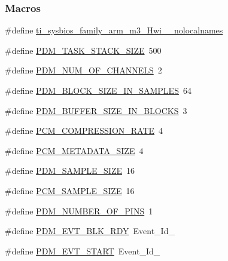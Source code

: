 \subsubsection*{Macros}
\begin{DoxyCompactItemize}
\item 
\#define \hyperlink{_p_d_m_c_c26_x_x_8h_aaa17ecf48f5762e2e1bdb0bab8aacf0c}{ti\+\_\+sysbios\+\_\+family\+\_\+arm\+\_\+m3\+\_\+\+Hwi\+\_\+\+\_\+nolocalnames}
\item 
\#define \hyperlink{_p_d_m_c_c26_x_x_8h_adc205204f69ea867c95b30efe1530746}{P\+D\+M\+\_\+\+T\+A\+S\+K\+\_\+\+S\+T\+A\+C\+K\+\_\+\+S\+I\+Z\+E}~500
\item 
\#define \hyperlink{_p_d_m_c_c26_x_x_8h_ab3e267d8e69eec7a1cc819e11ed3652b}{P\+D\+M\+\_\+\+N\+U\+M\+\_\+\+O\+F\+\_\+\+C\+H\+A\+N\+N\+E\+L\+S}~2
\item 
\#define \hyperlink{_p_d_m_c_c26_x_x_8h_aaf34b322942f71e96c00eaaf13e81612}{P\+D\+M\+\_\+\+B\+L\+O\+C\+K\+\_\+\+S\+I\+Z\+E\+\_\+\+I\+N\+\_\+\+S\+A\+M\+P\+L\+E\+S}~64
\item 
\#define \hyperlink{_p_d_m_c_c26_x_x_8h_ac27121ab901a1442bbebbdac45fce296}{P\+D\+M\+\_\+\+B\+U\+F\+F\+E\+R\+\_\+\+S\+I\+Z\+E\+\_\+\+I\+N\+\_\+\+B\+L\+O\+C\+K\+S}~3
\item 
\#define \hyperlink{_p_d_m_c_c26_x_x_8h_a98722a106401368b0df3e68c19c7edd3}{P\+C\+M\+\_\+\+C\+O\+M\+P\+R\+E\+S\+S\+I\+O\+N\+\_\+\+R\+A\+T\+E}~4
\item 
\#define \hyperlink{_p_d_m_c_c26_x_x_8h_ae553576c451c4277d4496b5fe7f26e24}{P\+C\+M\+\_\+\+M\+E\+T\+A\+D\+A\+T\+A\+\_\+\+S\+I\+Z\+E}~4
\item 
\#define \hyperlink{_p_d_m_c_c26_x_x_8h_ac840e0d8746e13c1e59d48221e050400}{P\+D\+M\+\_\+\+S\+A\+M\+P\+L\+E\+\_\+\+S\+I\+Z\+E}~16
\item 
\#define \hyperlink{_p_d_m_c_c26_x_x_8h_a77f1de681b5b50d6e6db60818b5a481d}{P\+C\+M\+\_\+\+S\+A\+M\+P\+L\+E\+\_\+\+S\+I\+Z\+E}~16
\item 
\#define \hyperlink{_p_d_m_c_c26_x_x_8h_af5494f23156b07d2e4a017d92bd65e59}{P\+D\+M\+\_\+\+N\+U\+M\+B\+E\+R\+\_\+\+O\+F\+\_\+\+P\+I\+N\+S}~1
\item 
\#define \hyperlink{_p_d_m_c_c26_x_x_8h_a3fc3f4783dd0476255c9cf416d8b6d55}{P\+D\+M\+\_\+\+E\+V\+T\+\_\+\+B\+L\+K\+\_\+\+R\+D\+Y}~Event\+\_\+\+Id\+\_
\item 
\#define \hyperlink{_p_d_m_c_c26_x_x_8h_a303036a69ae10d1b9ba1dd729dfb4aff}{P\+D\+M\+\_\+\+E\+V\+T\+\_\+\+S\+T\+A\+R\+T}~Event\+\_\+\+Id\+\_
\item 

\end{DoxyCompactItemize}
